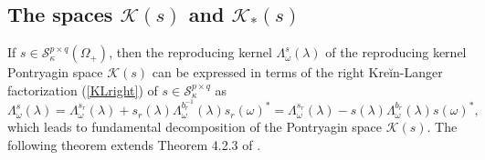 \documentclass[12pt,twoside,a4paper]{amsart}
\theoremstyle{definition}
\numberwithin{equation}{section}
\begin{document}
\subsection{The spaces ${{\mathcal K}}(s)$ and ${{\mathcal K}}_*(s)$}
If $s\in{\mathcal S}_{\kappa}^{p\times q}(\Omega_+)$, then the reproducing
kernel $\Lambda_\omega^s(\lambda)$ of the reproducing kernel Pontryagin space ${{\mathcal K}}(s)$ can   be expressed in terms of the
right Kre\u{i}n-Langer factorization (\ref{KLright})  of $s\in {\mathcal
S}^{p\times q}_\kappa$ as
\begin{equation}\label{eq:1.1}
{\mathsf \Lambda}^s_\omega(\lambda)={\mathsf
\Lambda}^{s_r}_\omega(\lambda)+ s_r(\lambda){\mathsf
\Lambda}_\omega^{b_r^{-1}}(\lambda)s_r(\omega)^* ={\mathsf
\Lambda}^{s_r}_\omega(\lambda)- s(\lambda){\mathsf
\Lambda}_\omega^{b_r}(\lambda)s(\omega)^*,
\end{equation}
which leads to fundamental decomposition of the Pontryagin space
${{\mathcal K}}(s)$. The following theorem extends Theorem 4.2.3 of \cite{ADRS}.
\end{document}
